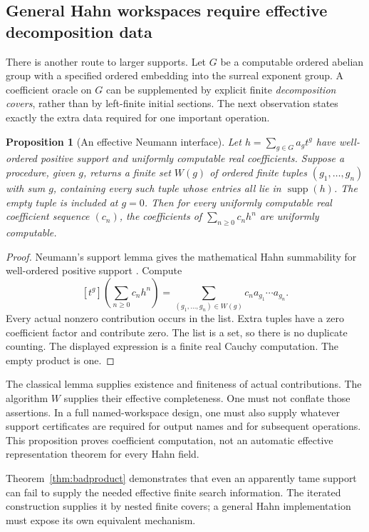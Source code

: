 \documentclass[11pt,letterpaper]{article}
\numberwithin{equation}{section}
\newtheorem{proposition}[theorem]{Proposition}
\theoremstyle{definition}
\theoremstyle{remark}
\newcommand{\supp}{\operatorname{supp}}
\newcommand{\coef}[2]{[t^{#1}]#2}
\begin{document}
\subsection{General Hahn workspaces require effective decomposition data}

There is another route to larger supports. Let $G$ be a computable ordered
abelian group with a specified ordered embedding into the surreal
exponent group. A coefficient oracle on $G$ can be supplemented by explicit
finite \emph{decomposition covers}, rather than by left-finite initial
sections. The next observation states exactly the extra data required for
one important operation.

\begin{proposition}[An effective Neumann interface]
\label{prop:neumanninterface}
Let $h=\sum_{g\in G}a_g t^g$ have well-ordered positive support and
uniformly computable real coefficients. Suppose a procedure, given $g$,
returns a finite set $W(g)$ of ordered finite tuples
$(g_1,\ldots,g_n)$ with sum $g$, containing every such tuple whose entries
all lie in $\supp(h)$. The empty tuple is included at $g=0$.
Then for every uniformly computable real coefficient sequence $(c_n)$,
the coefficients of $\sum_{n\ge0}c_nh^n$ are uniformly computable.
\end{proposition}
\begin{proof}
Neumann's support lemma gives the mathematical Hahn summability for
well-ordered positive support \cite{neumann}. Compute
\[
 \coef g{\left(\sum_{n\ge0}c_nh^n\right)}
   =\sum_{(g_1,\ldots,g_n)\in W(g)} c_n a_{g_1}\cdots a_{g_n}.
\]
Every actual nonzero contribution occurs in the list. Extra tuples have a
zero coefficient factor and contribute zero. The list is a set, so there
is no duplicate counting. The displayed expression is a finite real
Cauchy computation. The empty product is one.
\end{proof}

The classical lemma supplies existence and finiteness of actual
contributions. The algorithm $W$ supplies their effective completeness.
One must not conflate those assertions. In a full named-workspace design,
one must also supply whatever support certificates are required for
output names and for subsequent operations. This proposition proves
coefficient computation, not an automatic effective representation theorem
for every Hahn field.

Theorem~\ref{thm:badproduct} demonstrates that even an apparently tame
support can fail to supply the needed effective finite search information.
The iterated construction supplies it by nested finite covers; a general
Hahn implementation must expose its own equivalent mechanism.
\end{document}
